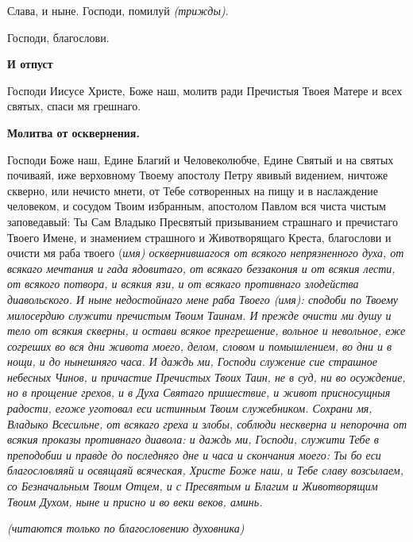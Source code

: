 Слава, и ныне. Господи, помилуй \itshape (трижды)\normalfont{}. 

Господи, благослови. 


\medskip


\bfseries И отпуст\normalfont{}


Господи Иисусе Христе, Боже наш, молитв ради Пречистыя Твоея Матере и всех святых, спаси мя грешнаго.


\bfseries Молитва от осквернения.\normalfont{}

Господи Боже наш, Едине Благий и Человеколюбче, Едине Святый и на святых почиваяй, иже верховному Твоему апостолу Петру явивый видением, ничтоже скверно, или нечисто мнети, от Тебе сотворенных на пищу и в наслаждение человеком, и сосудом Твоим избранным, апостолом Павлом вся чиста чистым заповедавый: Ты Сам Владыко Пресвятый призыванием страшнаго и пречистаго Твоего Имене, и знамением страшного и Животворящаго Креста, благослови и очисти мя раба твоего (\itshape имя\normalfont{}) осквернившагося от всякого непрязненного духа, от всякаго мечтания и гада ядовитаго, от всякаго беззакония и от всякия лести, от всякого потвора, и всякия язи, и от всякаго противнаго злодейства диавольского. И ныне недостойнаго мене раба Твоего (\itshape имя\normalfont{}): сподоби по Твоему милосердию служити пречистым Твоим Таинам. И прежде очисти ми душу и тело от всякия скверны, и остави всякое прегрешение, вольное и невольное, еже согреших во вся дни живота моего, делом, словом и помышлением, во дни и в нощи, и до нынешняго часа. И даждь ми, Господи служение сие страшное небесных Чинов, и причастие Пречистых Твоих Таин, не в суд, ни во осуждение, но в прощение грехов, и в Духа Святаго пришествие, и живот присносущныя радости, егоже уготовал еси истинным Твоим служебником. Сохрани мя, Владыко Всесильне, от всякаго греха и злобы, соблюди нескверна и непорочна от всякия проказы противнаго диавола: и даждь ми, Господи, служити Тебе в преподобии и правде до последняго дне и часа и скончания моего: Ты бо еси благословляяй и освящаяй всяческая, Христе Боже наш, и Тебе славу возсылаем, со Безначальным Твоим Отцем, и с Пресвятым и Благим и Животворящим Твоим Духом, ныне и присно и во веки веков, аминь.


\mychapterending

 


\itshape (читаются только по благословению духовника)

\normalfont{}

